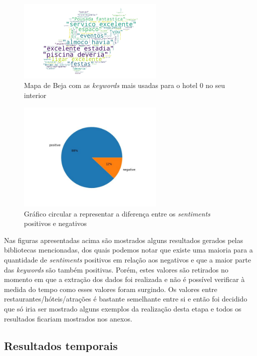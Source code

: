 \begin{figure}[!htb]
\centering
\includegraphics[width=7cm]{figuras/TripAdvisor/Hotels/hotel0_keywordcloud.jpeg}
\caption{Mapa de Beja com as \textit{keywords} mais usadas para o hotel 0 no seu interior}
\label{fig:exemplofig}
\end{figure}

\begin{figure}[!htb]
\centering
\includegraphics[width=7cm]{figuras/TripAdvisor/Hotels/hotel0_sentiments.jpeg}
\caption{Gráfico circular a representar a diferença entre os \textit{sentiments} positivos e negativos}
\label{fig:exemplofig}
\end{figure}

\newpage

Nas figuras apresentadas acima são mostrados alguns resultados gerados pelas bibliotecas mencionadas, dos quais podemos notar que existe uma maioria para a quantidade de \textit{sentiments} positivos em relação aos negativos e que a maior parte das \textit{keywords} são também positivas. Porém, estes valores são retirados no momento em que a extração dos dados foi realizada e não é possível verificar à medida do tempo como esses valores foram surgindo. Os valores entre restaurantes/hóteis/atrações é bastante semelhante entre si e então foi decidido que só iria ser mostrado alguns exemplos da realização desta etapa e todos os resultados ficariam mostrados nos anexos.

\subsection{Resultados temporais}

